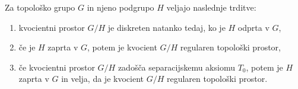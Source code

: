 \documentclass[mat1]{fmfdelo}
\begin{document}
\begin{izrek}\label{izr:kvocreg}
Za topološko grupo $G$ in njeno podgrupo $H$ veljajo naslednje trditve:
\begin{enumerate}
\item kvocientni prostor $G/H$ je diskreten natanko tedaj, ko je $H$ odprta v $G$,\label{podtrd:kvocreg1}
\item če je $H$ zaprta v $G$, potem je kvocient $G/H$ regularen topološki prostor,\label{podtrd:kvocreg2}
\item če kvocientni prostor $G/H$ zadošča separacijskemu aksiomu $T_0$, potem je $H$ zaprta v $G$ in velja, da je kvocient $G/H$ regularen topološki prostor.\label{podtrd:kvocreg3}
\end{enumerate}
\end{izrek}
\end{document}
